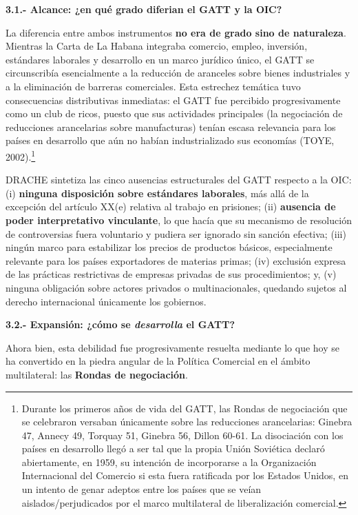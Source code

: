 \documentclass[10pt,a4paper]{article}
\begin{document}
\textbf{3.1.- Alcance: ¿en qué grado diferian el GATT y la OIC?}

La diferencia entre ambos instrumentos \textbf{no era de grado sino de naturaleza}. Mientras la Carta de La Habana integraba comercio, empleo, inversión, estándares laborales y desarrollo en un marco jurídico único, el GATT se circunscribía esencialmente a la reducción de aranceles sobre bienes industriales y a la eliminación de barreras comerciales. Esta estrechez temática tuvo consecuencias distributivas inmediatas: el GATT fue percibido progresivamente como un club de ricos, puesto que sus actividades principales (la negociación de reducciones arancelarias sobre manufacturas) tenían escasa relevancia para los países en desarrollo que aún no habían industrializado sus economías (TOYE, 2002).\footnote{%
  Durante los primeros años de vida del GATT, las Rondas de negociación que se celebraron versaban únicamente sobre las reducciones arancelarias: Ginebra 47, Annecy 49, Torquay 51, Ginebra 56, Dillon 60-61. La disociación con los países en desarrollo llegó a ser tal que la propia Unión Soviética declaró abiertamente, en 1959, su intención de incorporarse a la Organización Internacional del Comercio si esta fuera ratificada por los Estados Unidos, en un intento de genar adeptos entre los países que se veían aislados/perjudicados por el marco multilateral de liberalización comercial.
}

DRACHE sintetiza las cinco ausencias estructurales del GATT respecto a la OIC: (i) \textbf{ninguna disposición sobre estándares laborales}, más allá de la excepción del  artículo XX(e) relativa al trabajo en prisiones; (ii) \textbf{ausencia de poder interpretativo vinculante}, lo que hacía que su mecanismo de resolución de controversias fuera voluntario y pudiera ser ignorado sin sanción efectiva; (iii) ningún marco para estabilizar los precios de productos básicos, especialmente relevante para los países exportadores de materias primas; (iv) exclusión expresa de las prácticas restrictivas de empresas privadas de sus procedimientos; y, (v) ninguna obligación sobre actores privados o multinacionales, quedando sujetos al derecho internacional únicamente los gobiernos.

\textbf{3.2.- Expansión: ¿cómo se \textit{desarrolla} el GATT?}

Ahora bien, esta debilidad fue progresivamente resuelta mediante lo que hoy se ha convertido en la piedra angular de la Política Comercial en el ámbito multilateral: las \textbf{Rondas de negociación}.
\end{document}
